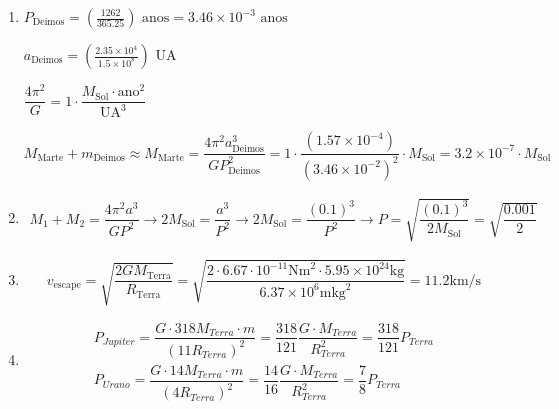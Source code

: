\documentclass{article}
\begin{document}
\begin{enumerate}
\item
$P_{\text{Deimos}} = \left(\frac{1262}{365.25}\right) \text{ anos} = 3.46 \times 10^{-3} \text{ anos}$

$a_{\text{Deimos}} = \left(\frac{2.35 \times 10^4}{1.5 \times 10^8}\right) \text{ UA}$

$ \dfrac{4 \pi^2}{G} = 1 \cdot \dfrac{M_{\text{Sol}} \cdot \text{ano}^2}{\text{UA}^3}$

$M_{\text{Marte}} + m_{\text{Deimos}} \approx M_{\text{Marte}} = \dfrac{4 \pi^2 a_{\text{Deimos}}^3}{G P_{\text{Deimos}}^2} = 1 \cdot \dfrac{(1.57 \times 10^{-4})}{(3.46 \times 10^{-2})^2} \cdot M_{\text{Sol}} = 3.2 \times 10^{-7} \cdot M_{\text{Sol}}$

\item
\begin{align*}
    M_1 + M_2 = \dfrac{4 \pi^2 a^3}{GP^2} \rightarrow
    2 M_{\text{Sol}} = \dfrac{a^3}{P^2} \rightarrow
    2 M_{\text{Sol}} = \dfrac{(0.1)^3}{P^2} \rightarrow
    P = \sqrt{\dfrac{(0.1)^3}{2 M_{\text{Sol}}}} = \sqrt{\dfrac{0.001}{2}}
\end{align*}

\item
\[v_{\text{escape}} = \sqrt{\dfrac{2GM_{\text{Terra}}}{R_{\text{Terra}}}} = \sqrt{\dfrac{2 \cdot 6.67 \cdot 10^{-11} \si{\newton\meter}^2 \cdot 5.95 \times 10^{24} \si{\kilo\gram}}{6.37 \times 10^6 \si{\meter\kilo\gram}^2}} = 11.2 \si{\kilo\meter}/\si{\second}\]

\item
\begin{align*}
    P_{Jupiter} = \dfrac{G \cdot 318M_{Terra} \cdot m}{(11R_{Terra})^2}
    = \dfrac{318}{121} \dfrac{G \cdot M_{Terra}}{R_{Terra}^2} = \dfrac{318}{121} P_{Terra}\\
    P_{Urano} = \dfrac{G \cdot 14M_{Terra} \cdot m}{(4R_{Terra})^2}
    = \dfrac{14}{16} \dfrac{G \cdot M_{Terra}}{R_{Terra}^2} = \dfrac{7}{8} P_{Terra}
\end{align*}

\end{enumerate}
\end{document}

